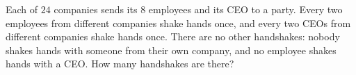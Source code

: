 Each of $24$ companies sends its $8$ employees and its CEO to a party. Every two employees from different companies shake hands once, and every two CEOs from different companies shake hands once. There are no other handshakes: nobody shakes hands with someone from their own company, and no employee shakes hands with a CEO. How many handshakes are there?
